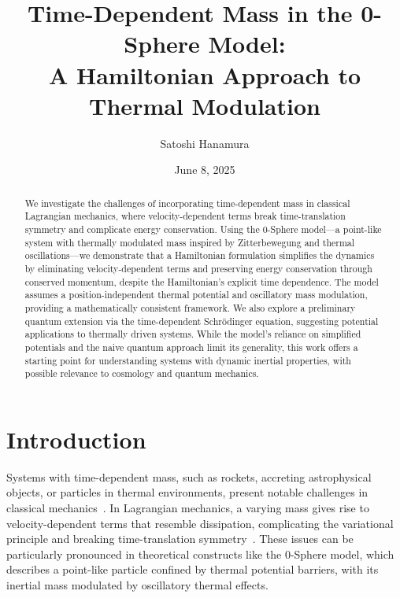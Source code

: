 \documentclass[%
 reprint,
 amsmath,amssymb,
 aps,
]{revtex4-1}
\numberwithin{equation}{section}%
\begin{document}


\title{Time-Dependent Mass in the 0-Sphere Model:\\ 
A Hamiltonian Approach to Thermal Modulation}
\author{Satoshi Hanamura}
\date{June 8, 2025}


\begin{abstract}
We investigate the challenges of incorporating time-dependent mass in classical Lagrangian mechanics, where velocity-dependent terms break time-translation symmetry and complicate energy conservation. Using the 0-Sphere model—a point-like system with thermally modulated mass inspired by Zitterbewegung and thermal oscillations—we demonstrate that a Hamiltonian formulation simplifies the dynamics by eliminating velocity-dependent terms and preserving energy conservation through conserved momentum, despite the Hamiltonian’s explicit time dependence. The model assumes a position-independent thermal potential and oscillatory mass modulation, providing a mathematically consistent framework. We also explore a preliminary quantum extension via the time-dependent Schrödinger equation, suggesting potential applications to thermally driven systems. While the model’s reliance on simplified potentials and the naive quantum approach limit its generality, this work offers a starting point for understanding systems with dynamic inertial properties, with possible relevance to cosmology and quantum mechanics.
\end{abstract}

\maketitle

\section{Introduction}

Systems with time-dependent mass, such as rockets, accreting astrophysical objects, or particles in thermal environments, present notable challenges in classical mechanics~\cite{goldstein2002}. In Lagrangian mechanics, a varying mass gives rise to velocity-dependent terms that resemble dissipation, complicating the variational principle and breaking time-translation symmetry~\cite{landau1976}. These issues can be particularly pronounced in theoretical constructs like the 0-Sphere model, which describes a point-like particle confined by thermal potential barriers, with its inertial mass modulated by oscillatory thermal effects.
\end{document}
